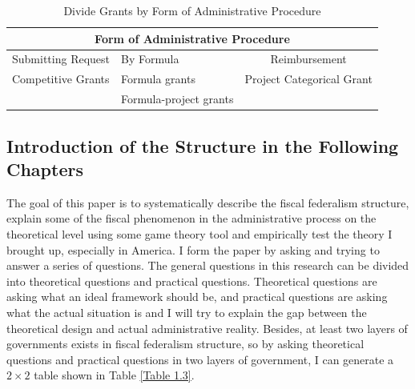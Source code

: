 \begin{table}[htbp]
    \centering
    \caption{Divide Grants by Form of Administrative Procedure}
    \begin{tabular}{clc}
        \toprule
        \multicolumn{3}{c}{Form of Administrative Procedure}                                                                                                     \\
        \midrule
        \multicolumn{1}{p{9.645em}}{ Submitting Request} & \multicolumn{1}{p{10.285em}}{               By Formula} & \multicolumn{1}{p{10.855em}}{Reimbursement} \\
        \midrule
        \multicolumn{1}{l}{Competitive Grants}           & Formula grants                                          & Project Categorical Grant                   \\
                                                         & Formula-project grants                                  &                                             \\
        \bottomrule
    \end{tabular}%
    \label{Table 1.2}%
\end{table}%





\subsection{Introduction of the Structure in the Following Chapters}
The goal of this paper is to systematically describe the fiscal federalism structure, explain some of the fiscal phenomenon in the administrative process on the theoretical level using some game theory tool and empirically test the theory I brought up, especially in America. I form the paper by asking and trying to answer a series of questions. The general questions in this research can be divided into theoretical questions and practical questions. Theoretical questions are asking what an ideal framework should be, and practical questions are asking what the actual situation is and I will try to explain the gap between the theoretical design and actual administrative reality. Besides, at least two layers of governments exists in fiscal federalism structure, so by asking theoretical questions and practical questions in two layers of government, I can generate a $2\times2$ table shown in Table \ref*{Table 1.3}.

